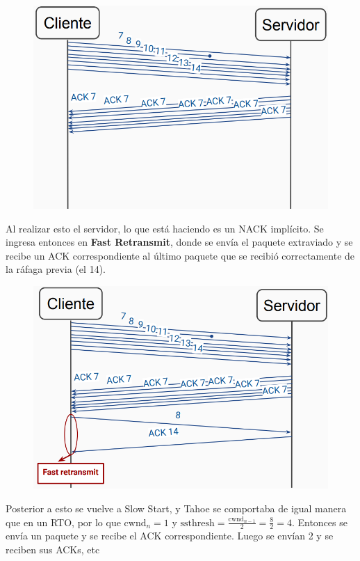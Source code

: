 \documentclass[titlepage,a4paper]{article}
\begin{document}
\begin{figure}[H]
\centering
\includegraphics[width=\textwidth]{imagenes/paqEnRafaga.png}
\end{figure}


Al realizar esto el servidor, lo que está haciendo es un NACK implícito. Se ingresa entonces en \textbf{Fast Retransmit}, donde se envía el paquete extraviado y se recibe un ACK correspondiente al último paquete que se recibió correctamente de la ráfaga previa (el 14).


\begin{figure}[H]
\centering
\includegraphics[width=\textwidth]{imagenes/fastRetransmit.png}
\end{figure}

Posterior a esto se vuelve a Slow Start, y Tahoe se comportaba de igual manera que en un RTO, por lo que $\mathrm{cwnd}_n = 1$ y $\mathrm{ssthresh} = \frac{\mathrm{cwnd}_{n-1}}{2} = \frac{8}{2} = 4 $. Entonces se envía un paquete y se recibe el ACK correspondiente. Luego se envían 2 y se reciben sus ACKs, etc
\end{document}
